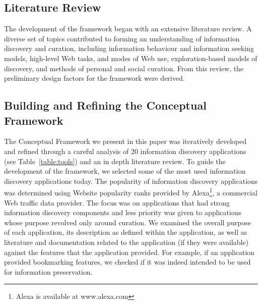 \documentclass[review]{elsarticle}
\begin{document}
{\subsection{Literature Review}
\label{subsection:lit_review}
The development of the framework began with an extensive literature review. A diverse set of topics contributed to forming an understanding of information discovery and curation, including information behaviour and information seeking models, high-level Web tasks, and modes of Web use, exploration-based models of discovery, and methods of personal and social curation. From this review, the preliminary design factors for the framework were derived.
}%

{\subsection{Building and Refining the Conceptual Framework}
\label{subsection:building}
The Conceptual Framework we present in this paper was iteratively developed and refined through a careful analysis of 20 information discovery applications (see Table~\ref{table:tools}) and an in depth literature review.   
%
To guide the development of the framework, we selected some of the most used information discovery applications today.
The popularity of information discovery applications was determined using Website popularity ranks provided by Alexa\footnote[1]{Alexa is available at www.alexa.com}, a commercial Web traffic data provider. The focus was on applications that had strong information discovery components and less priority was given to applications whose purpose revolved only around curation.
%
We examined the overall purpose of each application, its description as defined within the application, as well as literature and documentation related to the application (if they were available) against the features that the application provided. For example, if an application provided bookmarking features, we checked if it was indeed intended to be used for information preservation. 

}
\end{document}
